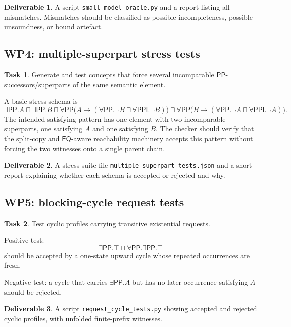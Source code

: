 \documentclass[11pt]{article}
\newcommand{\EQ}{\mathsf{EQ}}
\newcommand{\PP}{\mathsf{PP}}
\newcommand{\PPI}{\mathsf{PPI}}
\theoremstyle{definition}
\newtheorem{task}{Task}
\newtheorem{deliverable}{Deliverable}
\theoremstyle{plain}
\begin{document}
\begin{deliverable}
A script \texttt{small\_model\_oracle.py} and a report listing all mismatches.  Mismatches should be classified as possible incompleteness, possible unsoundness, or bound artefact.
\end{deliverable}

\subsection{WP4: multiple-superpart stress tests}

\begin{task}
Generate and test concepts that force several incomparable \(\PP\)-successors/superparts of the same semantic element.
\end{task}

A basic stress schema is
\[
\exists\PP.A
\sqcap
\exists\PP.B
\sqcap
\forall\PP\bigl(A\to(\forall\PP.\neg B\sqcap\forall\PPI.\neg B)\bigr)
\sqcap
\forall\PP\bigl(B\to(\forall\PP.\neg A\sqcap\forall\PPI.\neg A)\bigr).
\]
The intended satisfying pattern has one element with two incomparable superparts, one satisfying \(A\) and one satisfying \(B\).  The checker should verify that the split-copy and \(\EQ\)-aware reachability machinery accepts this pattern without forcing the two witnesses onto a single parent chain.

\begin{deliverable}
A stress-suite file \texttt{multiple\_superpart\_tests.json} and a short report explaining whether each schema is accepted or rejected and why.
\end{deliverable}

\subsection{WP5: blocking-cycle request tests}

\begin{task}
Test cyclic profiles carrying transitive existential requests.
\end{task}

Positive test:
\[
\exists\PP.\top\sqcap\forall\PP.\exists\PP.\top
\]
should be accepted by a one-state upward cycle whose repeated occurrences are fresh.

Negative test: a cycle that carries \(\exists\PP.A\) but has no later occurrence satisfying \(A\) should be rejected.

\begin{deliverable}
A script \texttt{request\_cycle\_tests.py} showing accepted and rejected cyclic profiles, with unfolded finite-prefix witnesses.
\end{deliverable}
\end{document}
